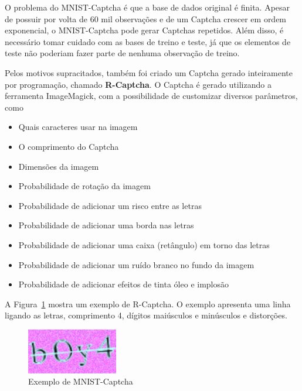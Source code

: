 \documentclass[12pt,twoside,brazilian]{book}
\providecommand{\tightlist}{%
  \setlength{\itemsep}{0pt}\setlength{\parskip}{0pt}}
\begin{document}
O problema do MNIST-Captcha é que a base de dados original é finita.
Apesar de possuir por volta de 60 mil observações e de um Captcha
crescer em ordem exponencial, o MNIST-Captcha pode gerar Captchas
repetidos. Além disso, é necessário tomar cuidado com as bases de treino
e teste, já que os elementos de teste não poderiam fazer parte de
nenhuma observação de treino.

Pelos motivos supracitados, também foi criado um Captcha gerado
inteiramente por programação, chamado \textbf{R-Captcha}. O Captcha é
gerado utilizando a ferramenta ImageMagick, com a possibilidade de
customizar diversos parâmetros, como

\begin{itemize}
\tightlist
\item
  Quais caracteres usar na imagem
\item
  O comprimento do Captcha
\item
  Dimensões da imagem
\item
  Probabilidade de rotação da imagem
\item
  Probabilidade de adicionar um risco entre as letras
\item
  Probabilidade de adicionar uma borda nas letras
\item
  Probabilidade de adicionar uma caixa (retângulo) em torno das letras
\item
  Probabilidade de adicionar um ruído branco no fundo da imagem
\item
  Probabilidade de adicionar efeitos de tinta óleo e implosão
\end{itemize}

A Figura~\ref{fig-captcha-r} mostra um exemplo de R-Captcha. O exemplo
apresenta uma linha ligando as letras, comprimento 4, dígitos maiúsculos
e minúsculos e distorções.

\begin{figure}

{\centering \includegraphics[width=1.5625in,height=\textheight]{./assets/img/captcha128c4a9c32e4_boy4.png}

}

\caption{\label{fig-captcha-r}Exemplo de MNIST-Captcha}

\end{figure}
\end{document}
